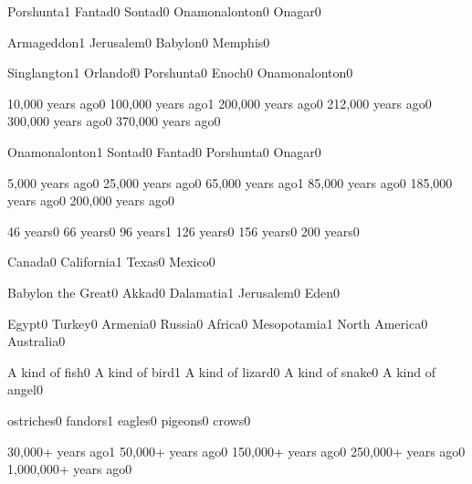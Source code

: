 {Porshunta}{1}
{Fantad}{0}
{Sontad}{0}
{Onamonalonton}{0}
{Onagar}{0}
\qstop

{Armageddon}{1}
{Jerusalem}{0}
{Babylon}{0}
{Memphis}{0}
\qstop

{Singlangton}{1}
{Orlandof}{0}
{Porshunta}{0}
{Enoch}{0}
{Onamonalonton}{0}
\qstop

{10,000 years ago}{0}
{100,000 years ago}{1}
{200,000 years ago}{0}
{212,000 years ago}{0}
{300,000 years ago}{0}
{370,000 years ago}{0}
\qstop

{Onamonalonton}{1}
{Sontad}{0}
{Fantad}{0}
{Porshunta}{0}
{Onagar}{0}
\qstop

{5,000 years ago}{0}
{25,000 years ago}{0}
{65,000 years ago}{1}
{85,000 years ago}{0}
{185,000 years ago}{0}
{200,000 years ago}{0}
\qstop

{46 years}{0}
{66 years}{0}
{96 years}{1}
{126 years}{0}
{156 years}{0}
{200 years}{0}
\qstop

{Canada}{0}
{California}{1}
{Texas}{0}
{Mexico}{0}
\qstop



{Babylon the Great}{0}
{Akkad}{0}
{Dalamatia}{1}
{Jerusalem}{0}
{Eden}{0}
\qstop

{Egypt}{0}
{Turkey}{0}
{Armenia}{0}
{Russia}{0}
{Africa}{0}
{Mesopotamia}{1}
{North America}{0}
{Australia}{0}
\qstop

{A kind of fish}{0}
{A kind of bird}{1}
{A kind of lizard}{0}
{A kind of snake}{0}
{A kind of angel}{0}
\qstop

{ostriches}{0}
{fandors}{1}
{eagles}{0}
{pigeons}{0}
{crows}{0}
\qstop

{30,000+ years ago}{1}
{50,000+ years ago}{0}
{150,000+ years ago}{0}
{250,000+ years ago}{0}
{1,000,000+ years ago}{0}
\qstop


